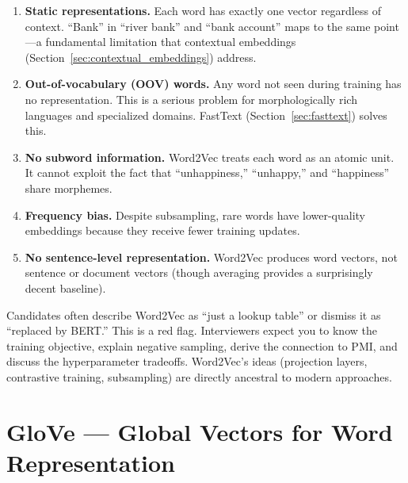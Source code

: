 \begin{enumerate}[label=\textbf{\arabic*.}]
    \item \textbf{Static representations.}  Each word has exactly one vector
    regardless of context.  ``Bank'' in ``river bank'' and ``bank account''
    maps to the same point---a fundamental limitation that contextual
    embeddings (Section~\ref{sec:contextual_embeddings}) address.

    \item \textbf{Out-of-vocabulary (OOV) words.}  Any word not seen during
    training has no representation.  This is a serious problem for
    morphologically rich languages and specialized domains.  FastText
    (Section~\ref{sec:fasttext}) solves this.

    \item \textbf{No subword information.}  Word2Vec treats each word as an
    atomic unit.  It cannot exploit the fact that ``unhappiness,''
    ``unhappy,'' and ``happiness'' share morphemes.

    \item \textbf{Frequency bias.}  Despite subsampling, rare words have
    lower-quality embeddings because they receive fewer training updates.

    \item \textbf{No sentence-level representation.}  Word2Vec produces
    word vectors, not sentence or document vectors (though averaging provides
    a surprisingly decent baseline).
\end{enumerate}

\begin{warningbox}
Candidates often describe Word2Vec as ``just a lookup table'' or dismiss it as
``replaced by BERT.''  This is a red flag.  Interviewers expect you to know
the training objective, explain negative sampling, derive the connection to
PMI, and discuss the hyperparameter tradeoffs.  Word2Vec's ideas (projection
layers, contrastive training, subsampling) are directly ancestral to modern
approaches.
\end{warningbox}


\section{GloVe --- Global Vectors for Word Representation}
\label{sec:glove}

